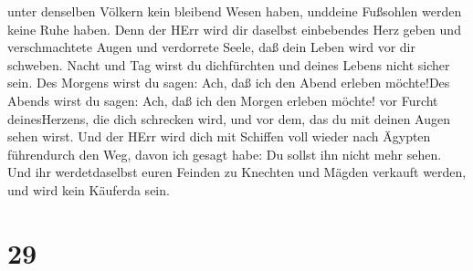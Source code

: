 unter denselben Völkern kein bleibend Wesen haben, unddeine Fußsohlen
werden keine Ruhe haben. Denn der HErr wird dir daselbst einbebendes
Herz geben und verschmachtete Augen und verdorrete Seele, 
daß dein Leben wird vor dir schweben. Nacht und Tag wirst du
dichfürchten und deines Lebens nicht sicher sein.  Des
Morgens wirst du sagen: Ach, daß ich den Abend erleben möchte!Des Abends
wirst du sagen: Ach, daß ich den Morgen erleben möchte! vor Furcht
deinesHerzens, die dich schrecken wird, und vor dem, das du mit deinen
Augen sehen wirst.  Und der HErr wird dich mit Schiffen
voll wieder nach Ägypten führendurch den Weg, davon ich gesagt habe: Du
sollst ihn nicht mehr sehen. Und ihr werdetdaselbst euren Feinden zu
Knechten und Mägden verkauft werden, und wird kein Käuferda sein.

\hypertarget{section-28}{%
\section{29}\label{section-28}}

